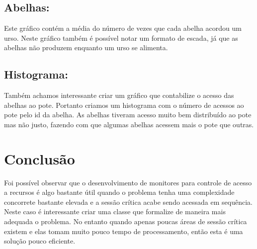 \documentclass[12pt,a4paper]{article}
\begin{document}
\subsection{Abelhas:}

Este gráfico contém a média do número de vezes que cada abelha acordou um urso. Neste gráfico também é possível notar um formato de escada, já que as abelhas não produzem enquanto um urso se alimenta.

\subsection{Histograma:}

Também achamos interessante criar um gráfico que contabilize o acesso das abelhas ao pote. Portanto criamos um histograma com o número de acessos ao pote pelo id da abelha. As abelhas tiveram acesso muito bem distribuído ao pote mas não justo, fazendo com que algumas abelhas acessem mais o pote que outras.

\section{Conclusão}

Foi possível observar que o desenvolvimento de monitores para controle de acesso a recursos é algo bastante útil quando o problema tenha uma complexidade concorrete bastante elevada e a sessão crítica acabe sendo acessada em sequência. Neste caso é interessante criar uma classe que formalize de maneira mais adequada o problema. No entanto quando apenas poucas áreas de sessão crítica existem e elas tomam muito pouco tempo de processamento, então esta é uma solução pouco eficiente.
\end{document}
